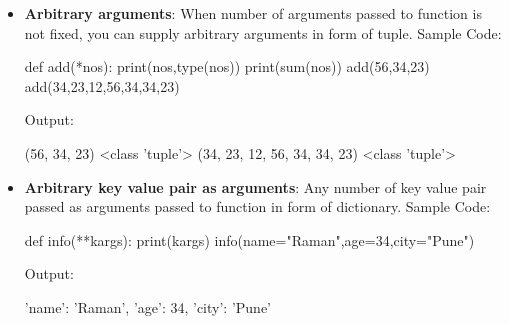 \begin{flushleft}
\begin{itemize}
		\newpage
		\item \textbf{Arbitrary arguments}: When number of arguments passed to function is not fixed, you can supply arbitrary arguments in form of tuple.
		\newline
		Sample Code:
		\begin{tcolorbox}[breakable,notitle,boxrule=-0pt,colback=black,colframe=black]
			\color{green}
			\font=9pt
			def add(*nos): \newline
			\hphantom{} \hphantom{} print(nos,type(nos)) \newline
			\hphantom{} \hphantom{} print(sum(nos)) \newline
			\newline
			add(56,34,23) \newline
			add(34,23,12,56,34,34,23)
			\font=4pt
		\end{tcolorbox}
		
		Output:
		\begin{tcolorbox}[breakable,notitle,boxrule=-0pt,colback=output,colframe=output]
			\color{black}
			(56, 34, 23) <class 'tuple'>  \newline
			(34, 23, 12, 56, 34, 34, 23) <class 'tuple'> 
			\font=4pt
		\end{tcolorbox}
		
		\bigskip
		
		\item \textbf{Arbitrary key value pair as arguments}: Any number of key value pair passed as arguments passed to function in form of dictionary.
		\newline
		Sample Code:
		\begin{tcolorbox}[breakable,notitle,boxrule=-0pt,colback=black,colframe=black]
			\color{green}
			\font=9pt
			def info(**kargs): \newline
			\hphantom{} \hphantom{} print(kargs) \newline
			\newline
			info(name="Raman",age=34,city="Pune")
			\font=4pt
		\end{tcolorbox}
		
		Output:
		\begin{tcolorbox}[breakable,notitle,boxrule=-0pt,colback=output,colframe=output]
			\color{black}
			\font=9pt
			{'name': 'Raman', 'age': 34, 'city': 'Pune'}
			\font=4pt
		\end{tcolorbox}

		
		
	\end{itemize}
	
\end{flushleft}

\newpage

